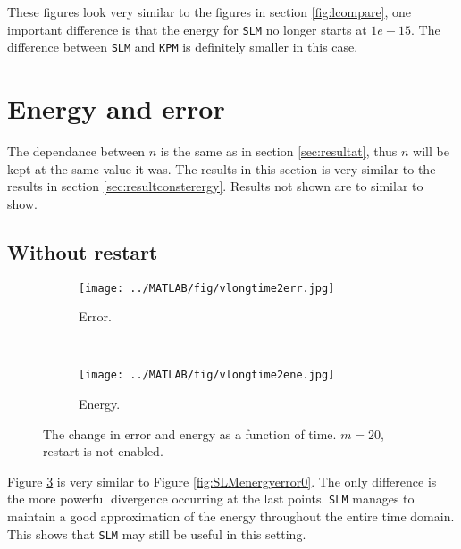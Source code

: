 These figures look very similar to the figures in section \ref{fig:lcompare}, one important difference is that the energy for \texttt{SLM} no longer starts at $1e-15$. The difference between \texttt{SLM} and \texttt{KPM} is definitely smaller in this case.


\section{Energy and error} %
The dependance between $n$ is the same as in section \ref{sec:resultat}, thus $n$ will be kept at the same value it was. The results in this section is very similar to the results in section \ref{sec:resultconsterergy}. Results not shown are to similar to show.
\subsection{Without restart} %
\begin{figure}[H]
        \centering
        \begin{subfigure}[b]{0.45\textwidth}
                \texttt{[image: ../MATLAB/fig/vlongtime2err.jpg]}
                \caption{ Error. }
                \label{fig:vlongtime2err}
        \end{subfigure}
        ~
        \begin{subfigure}[b]{0.45\textwidth}
                \texttt{[image: ../MATLAB/fig/vlongtime2ene.jpg]}
                \caption{ Energy. }
                \label{fig:vlongtime8err}
        \end{subfigure}
        \caption{ The change in error and energy as a function of time. $m = 20$, restart is not enabled. }
        \label{fig:vSLMenergyerror0}
\end{figure}
\noindent Figure \ref{fig:vSLMenergyerror0} is very similar to Figure \ref{fig:SLMenergyerror0}. The only difference is the more powerful divergence occurring at the last points. \texttt{SLM} manages to maintain a good approximation of the energy throughout the entire time domain. This shows that \texttt{SLM} may still be useful in this setting.
